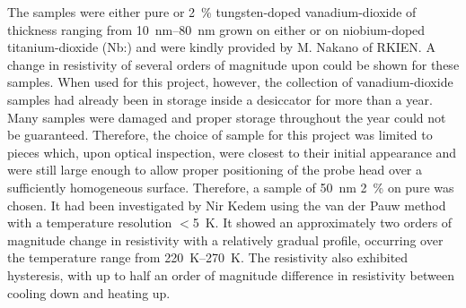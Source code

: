 The samples were either pure or \SI{2}{\percent} tungsten-doped vanadium-dioxide of thickness ranging from \SIrange{10}{80}{\nano\metre} grown on either \tiox{} or on niobium-doped titanium-dioxide (Nb:\tiox{}) and were kindly provided by M. Nakano of RKIEN. A change in resistivity of several orders of magnitude upon \mit{} could be shown for these samples. When used for this project, however, the collection of vanadium-dioxide samples had already been in storage inside a desiccator for more than a year. Many samples were damaged and proper storage throughout the year could not be guaranteed. Therefore, the choice of sample for this project was limited to pieces which, upon optical inspection, were closest to their initial appearance and were still large enough to allow proper positioning of the probe head over a sufficiently homogeneous surface. Therefore, a sample of \SI{50}{\nano\metre} \SI{2}{\percent} \wvadiox{} on pure \tiox{} was chosen. It had been investigated by Nir Kedem using the van der Pauw method with a temperature resolution $<$\SI{5}{\kelvin}. It showed an approximately two orders of magnitude change in resistivity with a relatively gradual profile, occurring over the temperature range from \SIrange{220}{270}{\kelvin}. The resistivity also exhibited hysteresis, with up to half an order of magnitude difference in resistivity between cooling down and heating up.

